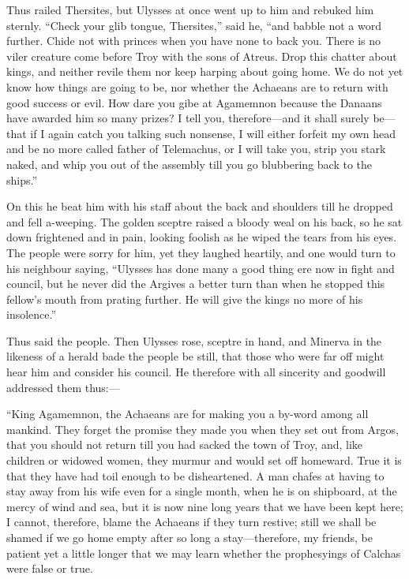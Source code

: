 Thus railed Thersites, but Ulysses at once went up to him and rebuked him
sternly. “Check your glib tongue, Thersites,” said he, “and babble not a
word further. Chide not with princes when you have none to back you. There
is no viler creature come before Troy with the sons of Atreus. Drop this
chatter about kings, and neither revile them nor keep harping about going
home. We do not yet know how things are going to be, nor whether the
Achaeans are to return with good success or evil. How dare you gibe at
Agamemnon because the Danaans have awarded him so many prizes? I tell you,
therefore—and it shall surely be—that if I again catch you
talking such nonsense, I will either forfeit my own head and be no more
called father of Telemachus, or I will take you, strip you stark naked,
and whip you out of the assembly till you go blubbering back to the
ships.”

On this he beat him with his staff about the back and shoulders till he
dropped and fell a-weeping. The golden sceptre raised a bloody weal on his
back, so he sat down frightened and in pain, looking foolish as he wiped
the tears from his eyes. The people were sorry for him, yet they laughed
heartily, and one would turn to his neighbour saying, “Ulysses has done
many a good thing ere now in fight and council, but he never did the
Argives a better turn than when he stopped this fellow’s mouth from
prating further. He will give the kings no more of his insolence.”

Thus said the people. Then Ulysses rose, sceptre in hand, and Minerva in
the likeness of a herald bade the people be still, that those who were far
off might hear him and consider his council. He therefore with all
sincerity and goodwill addressed them thus:—

“King Agamemnon, the Achaeans are for making you a by-word among all
mankind. They forget the promise they made you when they set out from
Argos, that you should not return till you had sacked the town of Troy,
and, like children or widowed women, they murmur and would set off
homeward. True it is that they have had toil enough to be disheartened. A
man chafes at having to stay away from his wife even for a single month,
when he is on shipboard, at the mercy of wind and sea, but it is now nine
long years that we have been kept here; I cannot, therefore, blame the
Achaeans if they turn restive; still we shall be shamed if we go home
empty after so long a stay—therefore, my friends, be patient yet a
little longer that we may learn whether the prophesyings of Calchas were
false or true.

